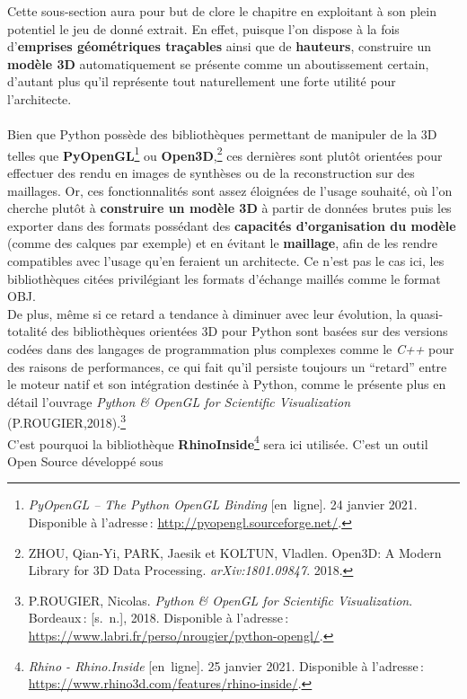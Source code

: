\documentclass[
  11pt,
  french,
]{article}
\begin{document}
Cette sous-section aura pour but de clore le chapitre en exploitant à
son plein potentiel le jeu de donné extrait. En effet, puisque l'on
dispose à la fois d'\textbf{emprises géométriques traçables} ainsi que
de \textbf{hauteurs}, construire un \textbf{modèle 3D} automatiquement
se présente comme un aboutissement certain, d'autant plus qu'il
représente tout naturellement une forte utilité pour l'architecte.\\
~\\
Bien que Python possède des bibliothèques permettant de manipuler de la
3D telles que \textbf{PyOpenGL}\footnote{\emph{PyOpenGL -- The Python
  OpenGL Binding} {[}en~ligne{]}. 24 janvier 2021. Disponible à
  l'adresse\,: \url{http://pyopengl.sourceforge.net/}.} ou
\textbf{Open3D},\footnote{ZHOU, Qian-Yi, PARK, Jaesik et KOLTUN,
  Vladlen. {Open3D}: {A} Modern Library for {3D} Data Processing.
  \emph{arXiv:1801.09847}. 2018.} ces dernières sont plutôt orientées
pour effectuer des rendu en images de synthèses ou de la reconstruction
sur des maillages. Or, ces fonctionnalités sont assez éloignées de
l'usage souhaité, où l'on cherche plutôt à \textbf{construire un modèle
3D} à partir de données brutes puis les exporter dans des formats
possédant des \textbf{capacités d'organisation du modèle} (comme des
calques par exemple) et en évitant le \textbf{maillage}, afin de les
rendre compatibles avec l'usage qu'en feraient un architecte. Ce n'est
pas le cas ici, les bibliothèques citées privilégiant les formats
d'échange maillés comme le format OBJ.\\
De plus, même si ce retard a tendance à diminuer avec leur évolution, la
quasi-totalité des bibliothèques orientées 3D pour Python sont basées
sur des versions codées dans des langages de programmation plus
complexes comme le \emph{C++} pour des raisons de performances, ce qui
fait qu'il persiste toujours un ``retard'' entre le moteur natif et son
intégration destinée à Python, comme le présente plus en détail
l'ouvrage \emph{Python \& OpenGL for Scientific Visualization}
(P.ROUGIER,2018).\footnote{P.ROUGIER, Nicolas. \emph{Python \& OpenGL
  for Scientific Visualization}. Bordeaux\,: {[}s.~n.{]}, 2018.
  Disponible à l'adresse\,:
  \url{https://www.labri.fr/perso/nrougier/python-opengl/}.}\\
C'est pourquoi la bibliothèque \textbf{RhinoInside}\footnote{\emph{Rhino
  - Rhino.Inside} {[}en~ligne{]}. 25 janvier 2021. Disponible à
  l'adresse\,: \url{https://www.rhino3d.com/features/rhino-inside/}.}
sera ici utilisée. C'est un outil Open Source développé sous
\end{document}
